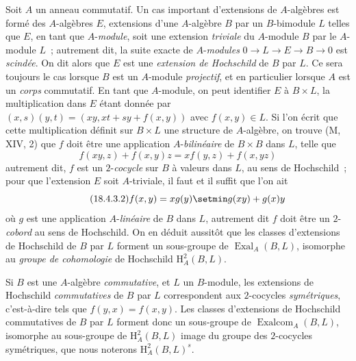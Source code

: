 \begin{env}[18.4.3]
\label{0.18.4.3-fr}
Soit $A$ un anneau commutatif. Un cas important d'extensions de
$A$-algèbres est formé des $A$-algèbres $E$, extensions d'une $A$-algèbre $B$
par un $B$-bimodule $L$ telles que $E$, en tant que $A$-\emph{module}, soit une
extension \emph{triviale} du $A$-module $B$ par le $A$-module $L$~; autrement
dit, la suite exacte de $A$-\emph{modules}
$0\to L\to E\to B\to0$ est \emph{scindée}. On dit alors que $E$ est une
\emph{extension de Hochschild} de $B$ par $L$. Ce sera toujours le cas lorsque
$B$ est un $A$-module \emph{projectif}, et en particulier lorsque $A$ est un
\emph{corps} commutatif. En tant que $A$-module, on peut identifier $E$ à
$B\times L$, la multiplication dans $E$ étant donnée par
$(x,s)(y,t)=(xy,xt+sy+f(x,y))$ avec $f(x,y)\in L$. Si l'on écrit que cette
multiplication définit sur $B\times L$ une structure de $A$-algèbre, on trouve
(M, XIV, 2) que $f$ doit être une application $A$-\emph{bilinéaire} de
$B\times B$ dans $L$, telle que
\begin{equation}
\label{0.18.4.3.1-fr}
\tag{18.4.3.1}
  f(xy,z)+f(x,y)z=xf(y,z)+f(x,yz)
\end{equation}
autrement dit, $f$ est un $2$-\emph{cocycle} sur $B$ à valeurs dans $L$, au
sens de Hochschild~; pour que l'extension $E$ soit $A$-triviale, il faut et il
suffit que l'on ait
\begin{equation}
\label{0.18.4.3.2-fr}
\tag{18.4.3.2}
  f(x,y)=xg(y)\setmin g(xy)+g(x)y
\end{equation}
où $g$ est une application $A$-\emph{linéaire} de $B$ dans $L$, autrement dit
$f$ doit être un $2$-\emph{cobord} au sens de Hochschild. On en déduit aussitôt
que les classes d'extensions de Hochschild de $B$ par $L$ forment un
sous-groupe de $\operatorname{Exal}_A(B,L)$, isomorphe au \emph{groupe de
cohomologie} de Hochschild $\mathrm H_A^2(B,L)$.

Si $B$ est une $A$-algèbre \emph{commutative}, et $L$ un $B$-module, les
extensions de Hochschild \emph{commutatives} de $B$ par $L$ correspondent aux
$2$-cocycles \emph{symétriques}, c'est-à-dire tels que $f(y,x)=f(x,y)$. Les
classes d'extensions de Hochschild commutatives de $B$ par $L$ forment donc un
sous-groupe de $\operatorname{Exalcom}_A(B,L)$, isomorphe au sous-groupe de
$\mathrm H_A^2(B,L)$ image du groupe des $2$-cocycles symétriques, que nous
noterons $\mathrm H_A^2(B,L)^s$.
\end{env}

